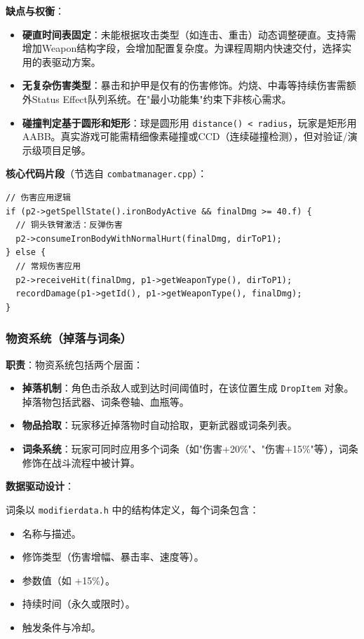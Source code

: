 ﻿\documentclass[utf8]{ctexart}
\begin{document}
\textbf{缺点与权衡}：
\begin{itemize}
  \item \textbf{硬直时间表固定}：未能根据攻击类型（如连击、重击）动态调整硬直。支持需增加Weapon结构字段，会增加配置复杂度。为课程周期内快速交付，选择实用的表驱动方案。
  \item \textbf{无复杂伤害类型}：暴击和护甲是仅有的伤害修饰。灼烧、中毒等持续伤害需额外Status Effect队列系统。在"最小功能集"约束下非核心需求。
  \item \textbf{碰撞判定基于圆形和矩形}：球是圆形用 \texttt{distance() < radius}，玩家是矩形用AABB。真实游戏可能需精细像素碰撞或CCD（连续碰撞检测），但对验证/演示级项目足够。
\end{itemize}

\textbf{核心代码片段}（节选自 \texttt{combatmanager.cpp}）：

\begin{verbatim}
// 伤害应用逻辑
if (p2->getSpellState().ironBodyActive && finalDmg >= 40.f) {
  // 铜头铁臂激活：反弹伤害
  p2->consumeIronBodyWithNormalHurt(finalDmg, dirToP1);
} else {
  // 常规伤害应用
  p2->receiveHit(finalDmg, p1->getWeaponType(), dirToP1);
  recordDamage(p1->getId(), p1->getWeaponType(), finalDmg);
}
\end{verbatim}

\subsubsection{物资系统（掉落与词条）}

\textbf{职责}：物资系统包括两个层面：

\begin{itemize}
  \item \textbf{掉落机制}：角色击杀敌人或到达时间阈值时，在该位置生成 \texttt{DropItem} 对象。掉落物包括武器、词条卷轴、血瓶等。
  \item \textbf{物品拾取}：玩家移近掉落物时自动拾取，更新武器或词条列表。
  \item \textbf{词条系统}：玩家可同时应用多个词条（如"伤害+20\%"、"伤害+15\%"等），词条修饰在战斗流程中被计算。
\end{itemize}

\textbf{数据驱动设计}：

词条以 \texttt{modifierdata.h} 中的结构体定义，每个词条包含：

\begin{itemize}
  \item 名称与描述。
  \item 修饰类型（伤害增幅、暴击率、速度等）。
  \item 参数值（如 +15\%）。
  \item 持续时间（永久或限时）。
  \item 触发条件与冷却。
\end{itemize}
\end{document}

